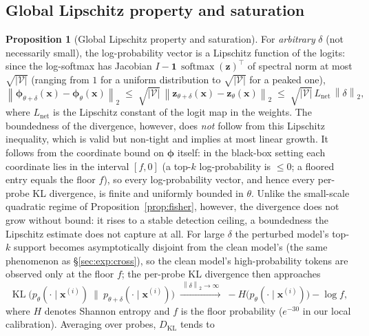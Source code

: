 \documentclass[11pt]{article}
\newcommand{\V}{\mathcal{V}}
\newcommand{\norm}[1]{\left\lVert #1 \right\rVert}
\newcommand{\softmax}{\operatorname{softmax}}
\newcommand{\KL}{\operatorname{KL}}
\theoremstyle{definition}
\newtheorem{proposition}{Proposition}
\begin{document}
\subsection{Global Lipschitz property and saturation}
\label{sec:app-sat}

\begin{proposition}[Global Lipschitz property and saturation]
\label{prop:saturation}
For \emph{arbitrary} $\delta$ (not necessarily small), the log-probability
vector is a Lipschitz function of the logits: since the log-softmax has
Jacobian $I - \mathbf{1}\,\softmax(\bm{z})^\top$ of spectral norm at most
$\sqrt{|\V|}$ (ranging from $1$ for a uniform distribution to $\sqrt{|\V|}$ for
a peaked one),
\begin{equation}
  \norm{\bm{\phi}_{\theta+\delta}(\bm{x}) - \bm{\phi}_\theta(\bm{x})}_2
  \;\le\; \sqrt{|\V|}\,\norm{\bm{z}_{\theta+\delta}(\bm{x}) - \bm{z}_\theta(\bm{x})}_2
  \;\le\; \sqrt{|\V|}\,L_{\mathrm{net}}\,\norm{\delta}_2,
  \label{eq:globlip}
\end{equation}
where $L_{\mathrm{net}}$ is the Lipschitz constant of the logit map in the
weights. The boundedness of the divergence, however, does \emph{not} follow
from this Lipschitz inequality, which is valid but non-tight and implies at most
linear growth. It follows from the coordinate bound on $\bm{\phi}$ itself: in the
black-box setting each coordinate lies in the interval $[f, 0]$ (a top-$k$
log-probability is $\le 0$; a floored entry equals the floor $f$), so every
log-probability vector, and hence every per-probe KL divergence, is finite and
uniformly bounded in $\theta$. Unlike the small-scale quadratic regime of
Proposition~\ref{prop:fisher}, however, the divergence does not grow without
bound: it rises to a stable detection ceiling, a boundedness the Lipschitz
estimate does not capture at all. For large $\delta$ the perturbed model's top-$k$ support becomes
asymptotically disjoint from the clean model's (the same phenomenon as
\S\ref{sec:exp:cross}), so the clean model's high-probability tokens are
observed only at the floor $f$; the per-probe KL divergence then approaches
\begin{equation}
  \KL\!\big(p_\theta(\cdot \mid \bm{x}^{(i)})\ \|\ p_{\theta+\delta}(\cdot \mid \bm{x}^{(i)})\big)
  \;\xrightarrow{\ \norm{\delta}_2 \to \infty\ }\;
  -H\big(p_\theta(\cdot \mid \bm{x}^{(i)})\big) - \log f,
  \label{eq:saturation}
\end{equation}
where $H$ denotes Shannon entropy and $f$ is the floor probability ($e^{-30}$
in our local calibration). Averaging over probes, $D_{\mathrm{KL}}$ tends to

\end{proposition}
\end{document}
